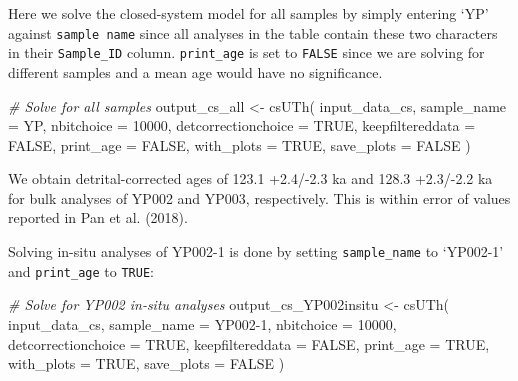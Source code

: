 \documentclass[]{elsarticle} %
\newenvironment{Shaded}{\begin{snugshade}}{\end{snugshade}}
\newcommand{\AttributeTok}[1]{\textcolor[rgb]{0.77,0.63,0.00}{#1}}
\newcommand{\CommentTok}[1]{\textcolor[rgb]{0.56,0.35,0.01}{\textit{#1}}}
\newcommand{\ConstantTok}[1]{\textcolor[rgb]{0.00,0.00,0.00}{#1}}
\newcommand{\DecValTok}[1]{\textcolor[rgb]{0.00,0.00,0.81}{#1}}
\newcommand{\FunctionTok}[1]{\textcolor[rgb]{0.00,0.00,0.00}{#1}}
\newcommand{\NormalTok}[1]{#1}
\newcommand{\OtherTok}[1]{\textcolor[rgb]{0.56,0.35,0.01}{#1}}
\newcommand{\StringTok}[1]{\textcolor[rgb]{0.31,0.60,0.02}{#1}}
\begin{document}
Here we solve the closed-system model for all samples by simply entering `YP' against \texttt{sample\ name} since all analyses in the table contain these two characters in their \texttt{Sample\_ID} column. \texttt{print\_age} is set to \texttt{FALSE} since we are solving for different samples and a mean age would have no significance.

\begin{Shaded}
\begin{Highlighting}[]
\CommentTok{\# Solve for all samples}
\NormalTok{output\_cs\_all }\OtherTok{\textless{}{-}}
  \FunctionTok{csUTh}\NormalTok{(}
\NormalTok{    input\_data\_cs,}
    \AttributeTok{sample\_name =} \StringTok{\textquotesingle{}YP\textquotesingle{}}\NormalTok{,}
    \AttributeTok{nbitchoice =} \DecValTok{10000}\NormalTok{,}
    \AttributeTok{detcorrectionchoice =} \ConstantTok{TRUE}\NormalTok{,}
    \AttributeTok{keepfiltereddata =} \ConstantTok{FALSE}\NormalTok{,}
    \AttributeTok{print\_age =} \ConstantTok{FALSE}\NormalTok{,}
    \AttributeTok{with\_plots =} \ConstantTok{TRUE}\NormalTok{,}
    \AttributeTok{save\_plots =} \ConstantTok{FALSE}
\NormalTok{  )}
\end{Highlighting}
\end{Shaded}

We obtain detrital-corrected ages of 123.1 +2.4/-2.3 ka and 128.3 +2.3/-2.2 ka for bulk analyses of YP002 and YP003, respectively. This is within error of values reported in Pan et al. (2018).

Solving in-situ analyses of YP002-1 is done by setting \texttt{sample\_name} to `YP002-1' and \texttt{print\_age} to \texttt{TRUE}:

\begin{Shaded}
\begin{Highlighting}[]
\CommentTok{\# Solve for YP002 in{-}situ analyses}
\NormalTok{output\_cs\_YP002insitu }\OtherTok{\textless{}{-}}
  \FunctionTok{csUTh}\NormalTok{(}
\NormalTok{    input\_data\_cs,}
    \AttributeTok{sample\_name =} \StringTok{\textquotesingle{}YP002{-}1\textquotesingle{}}\NormalTok{,}
    \AttributeTok{nbitchoice =} \DecValTok{10000}\NormalTok{,}
    \AttributeTok{detcorrectionchoice =} \ConstantTok{TRUE}\NormalTok{,}
    \AttributeTok{keepfiltereddata =} \ConstantTok{FALSE}\NormalTok{,}
    \AttributeTok{print\_age =} \ConstantTok{TRUE}\NormalTok{,}
    \AttributeTok{with\_plots =} \ConstantTok{TRUE}\NormalTok{,}
    \AttributeTok{save\_plots =} \ConstantTok{FALSE}
\NormalTok{  )}
\end{Highlighting}
\end{Shaded}
\end{document}
